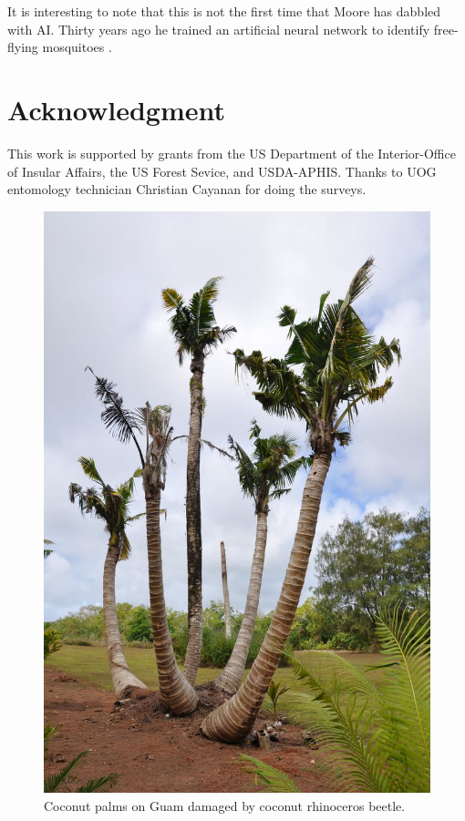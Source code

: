 \documentclass[letterpaper, 11pt]{scrartcl}
\begin{document}
It is interesting to note that this is not the first time that Moore has dabbled with AI. Thirty years ago he trained an artificial neural network to identify free-flying mosquitoes \cite{moore1991}.

\section*{Acknowledgment}

This work is supported by grants from the US Department of the Interior-Office of Insular Affairs, the US Forest Sevice, and USDA-APHIS.  Thanks to UOG entomology technician Christian Cayanan for doing the surveys.


\begin{figure}
	\centering
	\includegraphics[width=0.8\linewidth]{images/dying_coconuts.png}
	\caption{Coconut palms on Guam damaged by coconut rhinoceros beetle.}
	\label{fig:dying_coconuts}
\end{figure}
\end{document}
